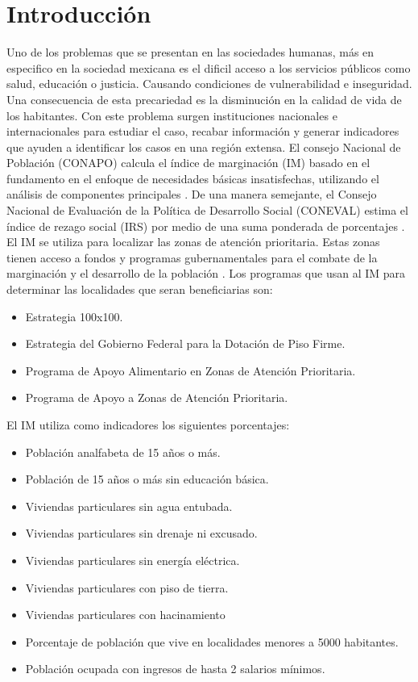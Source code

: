 \section{Introducción}

Uno de los problemas que se presentan en las sociedades humanas, más en especifico en la sociedad mexicana es el dificil acceso a los servicios públicos como salud, educación o justicia. Causando condiciones de vulnerabilidad e inseguridad. Una consecuencia de esta precariedad es la disminución en la calidad de vida de los habitantes. Con este problema surgen instituciones nacionales e internacionales para estudiar el caso, recabar información y generar indicadores que ayuden a identificar los casos en una región extensa. El consejo Nacional de Población (CONAPO) calcula el índice de marginación (IM) basado en el fundamento en el enfoque de necesidades básicas insatisfechas, utilizando el análisis de componentes principales \cite{conapo_2021}. De una manera semejante, el Consejo Nacional de Evaluación de la Política de Desarrollo Social (CONEVAL) estima el índice de rezago social (IRS) por medio de una suma ponderada de porcentajes \cite{CONEVAL_2007}.  El IM se utiliza para localizar las zonas de atención prioritaria. Estas zonas tienen acceso a fondos y programas gubernamentales para el combate de la marginación y el desarrollo de la población \cite{DOF_2011,DOF_2012,DOF_2013,DOF_2014,DOF_2015,DOF_2016,DOF_2017,DOF_2018,DOF_2019}. Los programas que usan al IM para determinar las localidades que seran beneficiarias son:

\begin{itemize}
    \item Estrategia 100x100\cite{CONEVAL_2013}.
    \item Estrategia del Gobierno Federal para la Dotación de Piso Firme\cite{DOF_2020}.
    \item Programa de Apoyo Alimentario en Zonas de Atención Prioritaria\cite{SEDESOL_2008}.
    \item Programa de Apoyo a Zonas de Atención Prioritaria\cite{DOF_2014_zonas}.
\end{itemize}


El IM utiliza como indicadores\cite{CONAPO_2022} los siguientes porcentajes:

\begin{itemize}
    \item Población analfabeta de 15 años o más.
    \item Población de 15 años o más sin educación básica.
    \item Viviendas particulares sin agua entubada.
    \item Viviendas particulares sin drenaje ni excusado.
    \item Viviendas particulares sin energía eléctrica.
    \item Viviendas particulares con piso de tierra.
    \item Viviendas particulares con hacinamiento
    \item Porcentaje de población que vive en localidades menores a 5000 habitantes.
    \item Población ocupada con ingresos de hasta 2 salarios mínimos.
\end{itemize}



